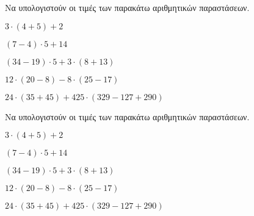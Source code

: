 Να υπολογιστούν οι τιμές των παρακάτω αριθμητικών παραστάσεων.
\begin{rlist}
\item $ 3\cdot(4+5)+2 $
\item $ (7-4)\cdot5+14 $
\item $ (34-19)\cdot5+3\cdot(8+13) $
\item $ 12\cdot(20-8)-8\cdot(25-17) $
\item $ 24\cdot(35+45)+425\cdot(329-127+290) $
\end{rlist}
Να υπολογιστούν οι τιμές των παρακάτω αριθμητικών παραστάσεων.
\begin{rlist}
\item $ 3\cdot(4+5)+2 $
\item $ (7-4)\cdot5+14 $
\item $ (34-19)\cdot5+3\cdot(8+13) $
\item $ 12\cdot(20-8)-8\cdot(25-17) $
\item $ 24\cdot(35+45)+425\cdot(329-127+290) $
\end{rlist}
